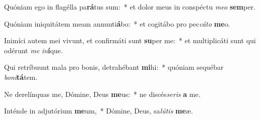 \item Quóniam ego in flagélla pa\textbf{rá}tus sum:~* et dolor meus in conspé\-ctu \textit{meo} \textbf{sem}per.
\item Quóniam iniquitátem meam annunti\textbf{á}bo:~* et cogitábo pro pec\tinyhspace\textit{cáto} \textbf{me}o.
\item Inimíci autem mei vivunt, et confirmáti sunt \textbf{su}per me:~* et multiplicáti sunt qui odérunt \textit{me} \textit{in}\textbf{í}que.
\item Qui retríbuunt mala pro bonis, detrahébant \textbf{mi}hi:~* quóniam sequébar \textit{boni}\textbf{tá}tem.
\item Ne derelínquas me, Dómine, Deus \textbf{me}us:~* ne discés\tinyhspace\textit{seris} \textbf{a} me.
\item Inténde in adjutórium \textbf{me}um,~* Dómine, Deus, sa\tinyhspace\textit{lútis} \textbf{me}æ.
